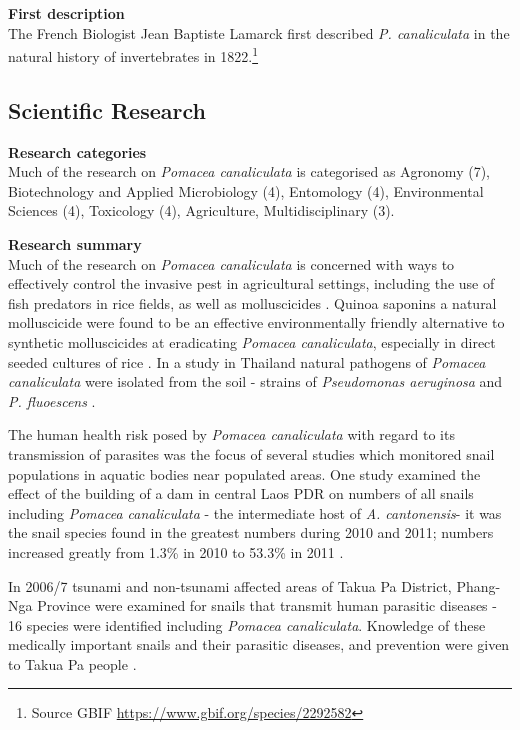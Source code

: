 \documentclass[openany]{book}
\let\rmarkdownfootnote\footnote%
\def\footnote{\protect\rmarkdownfootnote}
\theoremstyle{definition}
\theoremstyle{definition}
\theoremstyle{definition}
\theoremstyle{remark}
\begin{document}
\textbf{First description}\\
The French Biologist Jean Baptiste Lamarck first described \emph{P.
canaliculata} in the natural history of invertebrates in 1822.\footnote{Source
  GBIF \url{https://www.gbif.org/species/2292582}}

\hypertarget{scientific-research-7}{%
\subsection{Scientific Research}\label{scientific-research-7}}

\textbf{Research categories}\\
Much of the research on \emph{Pomacea canaliculata} is categorised as
Agronomy (7), Biotechnology and Applied Microbiology (4), Entomology
(4), Environmental Sciences (4), Toxicology (4), Agriculture,
Multidisciplinary (3).

\textbf{Research summary}\\
Much of the research on \emph{Pomacea canaliculata} is concerned with
ways to effectively control the invasive pest in agricultural settings,
including the use of fish predators in rice fields, as well as
molluscicides \citep{De_La_Cruz_2001, Su_Sin_2006}. Quinoa saponins a
natural molluscicide were found to be an effective environmentally
friendly alternative to synthetic molluscicides at eradicating
\emph{Pomacea canaliculata}, especially in direct seeded cultures of
rice \citep{Joshi_2008}. In a study in Thailand natural pathogens of
\emph{Pomacea canaliculata} were isolated from the soil - strains of
\emph{Pseudomonas aeruginosa} and \emph{P. fluoescens}
\citep{Chobchuenchom_2003}.

The human health risk posed by \emph{Pomacea canaliculata} with regard
to its transmission of parasites was the focus of several studies which
monitored snail populations in aquatic bodies near populated areas. One
study examined the effect of the building of a dam in central Laos PDR
on numbers of all snails including \emph{Pomacea canaliculata} - the
intermediate host of \emph{A. cantonensis}- it was the snail species
found in the greatest numbers during 2010 and 2011; numbers increased
greatly from 1.3\% in 2010 to 53.3\% in 2011 \citep{Brey_2015}.

In 2006/7 tsunami and non-tsunami affected areas of Takua Pa District,
Phang-Nga Province were examined for snails that transmit human
parasitic diseases - 16 species were identified including \emph{Pomacea
canaliculata}. Knowledge of these medically important snails and their
parasitic diseases, and prevention were given to Takua Pa people
\citep{Butraporn_2010}.
\end{document}
